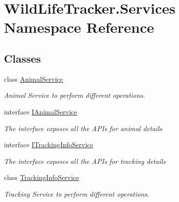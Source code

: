 \hypertarget{namespaceWildLifeTracker_1_1Services}{}\section{Wild\+Life\+Tracker.\+Services Namespace Reference}
\label{namespaceWildLifeTracker_1_1Services}
\subsection*{Classes}
\begin{DoxyCompactItemize}
\item 
class \hyperlink{classWildLifeTracker_1_1Services_1_1AnimalService}{Animal\+Service}
\begin{DoxyCompactList}\small\item\em Animal Service to perform different operations. \end{DoxyCompactList}\item 
interface \hyperlink{interfaceWildLifeTracker_1_1Services_1_1IAnimalService}{I\+Animal\+Service}
\begin{DoxyCompactList}\small\item\em The interface exposes all the A\+P\+Is for animal details \end{DoxyCompactList}\item 
interface \hyperlink{interfaceWildLifeTracker_1_1Services_1_1ITrackingInfoService}{I\+Tracking\+Info\+Service}
\begin{DoxyCompactList}\small\item\em The interface exposes all the A\+P\+Is for tracking details \end{DoxyCompactList}\item 
class \hyperlink{classWildLifeTracker_1_1Services_1_1TrackingInfoService}{Tracking\+Info\+Service}
\begin{DoxyCompactList}\small\item\em Tracking Service to perform different operations. \end{DoxyCompactList}\end{DoxyCompactItemize}
